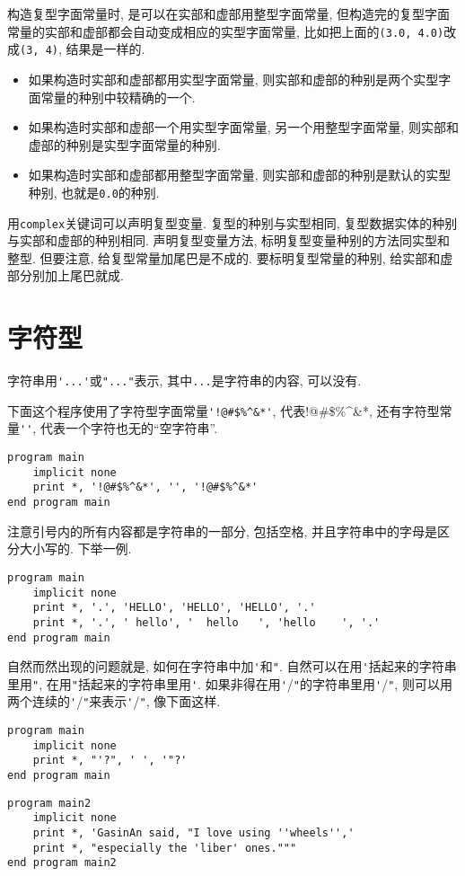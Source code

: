 构造复型字面常量时, 是可以在实部和虚部用整型字面常量, 但构造完的复型字面常量的实部和虚部都会自动变成相应的实型字面常量, 比如把上面的\verb|(3.0, 4.0)|改成\verb|(3, 4)|, 结果是一样的.
\begin{itemize}
    \item 如果构造时实部和虚部都用实型字面常量, 则实部和虚部的种别是两个实型字面常量的种别中较精确的一个.
    \item 如果构造时实部和虚部一个用实型字面常量, 另一个用整型字面常量, 则实部和虚部的种别是实型字面常量的种别.
    \item 如果构造时实部和虚部都用整型字面常量, 则实部和虚部的种别是默认的实型种别, 也就是\verb|0.0|的种别.
\end{itemize}

用\verb|complex|关键词可以声明复型变量. 复型的种别与实型相同, 复型数据实体的种别与实部和虚部的种别相同. 声明复型变量方法, 标明复型变量种别的方法同实型和整型. 但要注意, 给复型常量加尾巴是不成的. 要标明复型常量的种别, 给实部和虚部分别加上尾巴就成.

\section{字符型}\label{fortran_char}

字符串用\verb|'...'|或\verb|"..."|表示, 其中\verb|...|是字符串的内容, 可以没有.

下面这个程序使用了字符型字面常量\verb|'!@#$%^&*'|, 代表!@\#\$\%\^{}\&*, 还有字符型常量\verb|''|, 代表一个字符也无的``空字符串''.
\begin{lstlisting}
program main
    implicit none
    print *, '!@#$%^&*', '', '!@#$%^&*'
end program main
\end{lstlisting}

注意引号内的所有内容都是字符串的一部分, 包括空格, 并且字符串中的字母是区分大小写的. 下举一例.
\begin{lstlisting}
program main
    implicit none
    print *, '.', 'HELLO', 'HELLO', 'HELLO', '.'
    print *, '.', ' hello', '  hello   ', 'hello    ', '.'
end program main
\end{lstlisting}

自然而然出现的问题就是, 如何在字符串中加\verb|'|和\verb|"|. 自然可以在用\verb|'|括起来的字符串里用\verb|"|, 在用\verb|"|括起来的字符串里用\verb|'|. 如果非得在用\verb|'|/\verb|"|的字符串里用\verb|'|/\verb|"|, 则可以用两个连续的\verb|'|/\verb|"|来表示\verb|'|/\verb|"|, 像下面这样.
\begin{lstlisting}
program main
    implicit none
    print *, "'?", ' ', '"?'
end program main
\end{lstlisting}
\begin{lstlisting}
program main2
    implicit none
    print *, 'GasinAn said, "I love using ''wheels'','
    print *, "especially the 'liber' ones."""
end program main2
\end{lstlisting}

